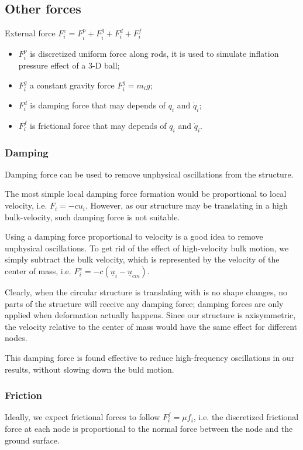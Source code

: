 \documentclass[letterpaper,9pt]{article}
\begin{document}
\begin{multicols}{2}
		\subsection{Other forces}
			External force $F_i^e = F_i^p + F_i^g + F_i^d + F_i^f$
			\begin{itemize}
				\item $F_i^p$ is discretized uniform force along rods, it is used to simulate inflation pressure effect of a 3-D ball;
				\item $F_i^g$ a constant gravity force $F_i^g = m_ig$;
				\item $F_i^d$ is damping force that may depends of $q_i$ and $\dot q_i$;
				\item $F_i^f$ is frictional force that may depends of $q_i$ and $\dot q_i$.
			\end{itemize}
			\subsubsection{Damping}
				Damping force can be used to remove unphysical oscillations from the structure.
			
				The most simple local damping force formation would be proportional to local velocity, i.e. $F_i = -cu_i$. However, as our structure may be translating in a high bulk-velocity, such damping force is not suitable.
				
				Using a damping force proportional to velocity is a good idea to remove unphysical oscillations. To get rid of the effect of high-velocity bulk motion, we simply subtract the bulk velocity, which is represented by the velocity of the center of mass, i.e. $F_i^s = -c(\underline u_{i} - \underline u_{cm})$.
				
				Clearly, when the circular structure is translating with is no shape changes, no parts of the structure will receive any damping force; damping forces are only applied when deformation actually happens. Since our structure is axisymmetric, the velocity relative to the center of mass would have the same effect for different nodes. 
				
				This damping force is found effective to reduce high-frequency oscillations in our results, without slowing down the buld motion.
			\subsubsection{Friction}
				Ideally, we expect frictional forces to follow $F_i^f = \mu f_i$, i.e. the discretized frictional force at each node is proportional to the normal force between the node and the ground surface.
				

\end{multicols}
\end{document}
